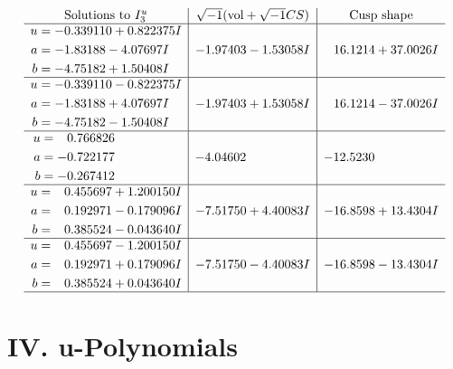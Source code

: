 \documentclass[1p]{elsarticle_modified}
\theoremstyle{definition}
\newcommand{\I}{\sqrt{-1}}
\begin{document}
$$\begin{array}{c|c|c}  
\text{Solutions to }I^u_{3}& \I (\text{vol} + \sqrt{-1}CS) & \text{Cusp shape}\\
 \hline 
\begin{aligned}
u &= -0.339110 + 0.822375 I \\
a &= -1.83188 - 4.07697 I \\
b &= -4.75182 + 1.50408 I\end{aligned}
 & -1.97403 - 1.53058 I & \phantom{-}16.1214 + 37.0026 I \\ \hline\begin{aligned}
u &= -0.339110 - 0.822375 I \\
a &= -1.83188 + 4.07697 I \\
b &= -4.75182 - 1.50408 I\end{aligned}
 & -1.97403 + 1.53058 I & \phantom{-}16.1214 - 37.0026 I \\ \hline\begin{aligned}
u &= \phantom{-}0.766826\phantom{ +0.000000I} \\
a &= -0.722177\phantom{ +0.000000I} \\
b &= -0.267412\phantom{ +0.000000I}\end{aligned}
 & -4.04602\phantom{ +0.000000I} & -12.5230\phantom{ +0.000000I} \\ \hline\begin{aligned}
u &= \phantom{-}0.455697 + 1.200150 I \\
a &= \phantom{-}0.192971 - 0.179096 I \\
b &= \phantom{-}0.385524 - 0.043640 I\end{aligned}
 & -7.51750 + 4.40083 I & -16.8598 + 13.4304 I \\ \hline\begin{aligned}
u &= \phantom{-}0.455697 - 1.200150 I \\
a &= \phantom{-}0.192971 + 0.179096 I \\
b &= \phantom{-}0.385524 + 0.043640 I\end{aligned}
 & -7.51750 - 4.40083 I & -16.8598 - 13.4304 I\\
 \hline 
 \end{array}$$\newpage
\newpage\renewcommand{\arraystretch}{1}
\centering \section*{ IV. u-Polynomials}
\end{document}
